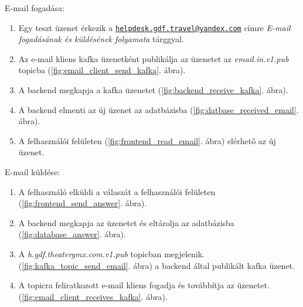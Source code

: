 E-mail fogadása:
\begin{enumerate}
	\item Egy teszt üzenet érkezik a \href{mailto:helpdesk.gdf.travel@yandex.com}{\nolinkurl{helpdesk.gdf.travel@yandex.com}} címre
	\textit{E-mail fogadásának és küldésének folyamata} tárggyal.
	\item Az e-mail kliens kafka üzenetként publikálja az üzenetet az \textit{email.in.v1.pub} topicba (\ref{fig:email_client_send_kafka}. ábra).
	\item A backend megkapja a kafka üzenetet (\ref{fig:backend_receive_kafka}. ábra).
	\item A backend elmenti az új üzenet az adatbázisba (\ref{fig:datbase_received_email}. ábra).
	\item A felhasználói felületen (\ref{fig:frontend_read_email}. ábra) elérhető az új üzenet.
\end{enumerate}

\bigskip

E-mail küldése:
\begin{enumerate}
	\item A felhasználó elküldi a válaszát a felhasználói felületen (\ref{fig:frontend_send_answer}. ábra).
	\item A backend megkapja az üzenetet és eltárolja az adatbázisba (\ref{fig:database_answer}. ábra).
	\item A \textit{h.gdf.theater\textunderscore gmx.com.v1.pub} topicban megjelenik. (\ref{fig:kafka_topic_send_email}. ábra) a backend által publikált kafka üzenet.
	\item A topicra feliratkozott e-mail kliens fogadja és továbbítja az üzenetet. (\ref{fig:email_client_receives_kafka}. ábra).
\end{enumerate}
 

